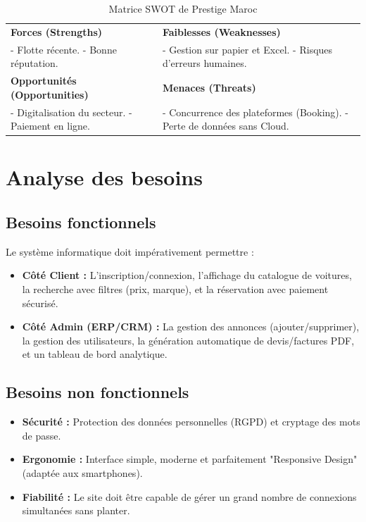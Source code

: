 \documentclass[12pt, a4paper]{report}
\begin{document}
\begin{table}[H]
    \centering
    \renewcommand{\arraystretch}{1.5}
    \begin{tabular}{|p{7cm}|p{7cm}|}
        \hline
        \cellcolor{green!15}\textbf{Forces (Strengths)} & \cellcolor{red!15}\textbf{Faiblesses (Weaknesses)} \\
        - Flotte récente. \newline - Bonne réputation. & - Gestion sur papier et Excel. \newline - Risques d'erreurs humaines. \\
        \hline
        \cellcolor{blue!15}\textbf{Opportunités (Opportunities)} & \cellcolor{orange!15}\textbf{Menaces (Threats)} \\
        - Digitalisation du secteur. \newline - Paiement en ligne. & - Concurrence des plateformes (Booking). \newline - Perte de données sans Cloud. \\
        \hline
    \end{tabular}
    \caption{Matrice SWOT de Prestige Maroc}
\end{table}

\section{Analyse des besoins}

\subsection{Besoins fonctionnels}
Le système informatique doit impérativement permettre :
\begin{itemize}
    \item \textbf{Côté Client :} L'inscription/connexion, l'affichage du catalogue de voitures, la recherche avec filtres (prix, marque), et la réservation avec paiement sécurisé.
    \item \textbf{Côté Admin (ERP/CRM) :} La gestion des annonces (ajouter/supprimer), la gestion des utilisateurs, la génération automatique de devis/factures PDF, et un tableau de bord analytique.
\end{itemize}

\subsection{Besoins non fonctionnels}
\begin{itemize}
    \item \textbf{Sécurité :} Protection des données personnelles (RGPD) et cryptage des mots de passe.
    \item \textbf{Ergonomie :} Interface simple, moderne et parfaitement "Responsive Design" (adaptée aux smartphones).
    \item \textbf{Fiabilité :} Le site doit être capable de gérer un grand nombre de connexions simultanées sans planter.
\end{itemize}
\end{document}
